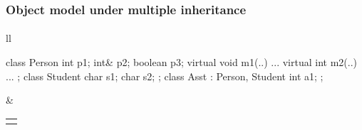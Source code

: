 \documentclass{beamer}
\begin{document}
\begin{frame}[fragile]
\frametitle{Object model under multiple inheritance}
\framesubtitle{}
\begin{tabular}{ll}
\begin{minipage}{4.3cm}
\begin{cplus3}
class Person
{ 
   int p1;
   int& p2;
   boolean p3; 
   virtual void m1(..) {...}
   virtual int m2(..) {...}  
};
class Student 
{
   char s1;
   char s2;
};
class Asst : Person, Student 
{
    int a1;
};
\end{cplus3}
\end{minipage}

& 

\begin{tabular}{l}
{\small 
\begin{tikzpicture}

\draw (0,-2.5)  rectangle (1.2,-3.0);
\pgftext[at={\pgfpoint{0.5cm}{-2.75cm}}]{a1} ;

\draw (0,-2.5)  rectangle (1.2,-2.0);
\pgftext[at={\pgfpoint{0.5cm}{-2.25cm}}]{} ;
\draw[->, thick] (1.0, -2.25) -- (3.0,-2.25); 
\pgftext[at={\pgfpoint{3.8cm}{-2.25cm}}]{\textit{vtbl Asst}} ;

\draw (0,-2.0)  rectangle (1.2,-1.0);
\pgftext[at={\pgfpoint{0.5cm}{-1.25cm}}]{s1} ;
\pgftext[at={\pgfpoint{0.5cm}{-1.75cm}}]{s2} ;

\draw (0,-1.0)  rectangle (1.2,-0.5);
\pgftext[at={\pgfpoint{-0.25cm}{-0.75cm}}]{} ;
\draw[->, thick] (1.0, -0.75) -- (3.0,-0.75); 
\pgftext[at={\pgfpoint{4.0cm}{-0.75cm}}]{\textit{vtbl Student}} ;

\pgftext[at={\pgfpoint{0.5cm}{-0.25cm}}]{p1} ;
\pgftext[at={\pgfpoint{0.5cm}{0.25cm}}]{p2} ;
\pgftext[at={\pgfpoint{0.5cm}{0.75cm}}]{p3} ;
\draw (0,-0.5)  rectangle (1.2,1.5);

\draw (0,1.0)  rectangle (1.2,1.5);
\pgftext[at={\pgfpoint{0.5cm}{1.25cm}}]{} ;
\draw[->, thick] (1.0, 1.25) -- (3.0,1.25); 











\end{tikzpicture}}
\end{tabular}
\end{tabular}
\end{frame}
\end{document}
